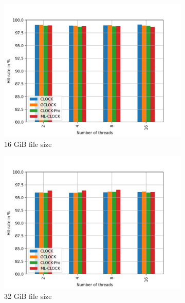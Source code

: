 \documentclass[
	12pt,
	a4paper,
	abstract,
	bibliography=totoc,
	chapterprefix,
	headings=openright,
	numbers=endperiod,
	parskip=half,
	twoside,
]{scrreprt}
\begin{document}
\begin{figure}[H]
	\centering
	\begin{subfigure}{0.4\textwidth}
		\includegraphics[width=\textwidth]{multi_16_gb_rw_90to10_normal.jpg}		
		\caption{16 GiB file size}
		\label{fig:rw_90to10 16 normal}
	\end{subfigure}
	\hfill
	\begin{subfigure}{0.4\textwidth}
		\includegraphics[width=\textwidth]{multi_32_gb_rw_90to10_normal.jpg}		
		\caption{32 GiB file size}
		\label{fig:rw_90to10 32 normal}
	\end{subfigure}
	\hfill
	\begin{subfigure}{0.4\textwidth}

\end{subfigure}
\end{figure}
\end{document}
